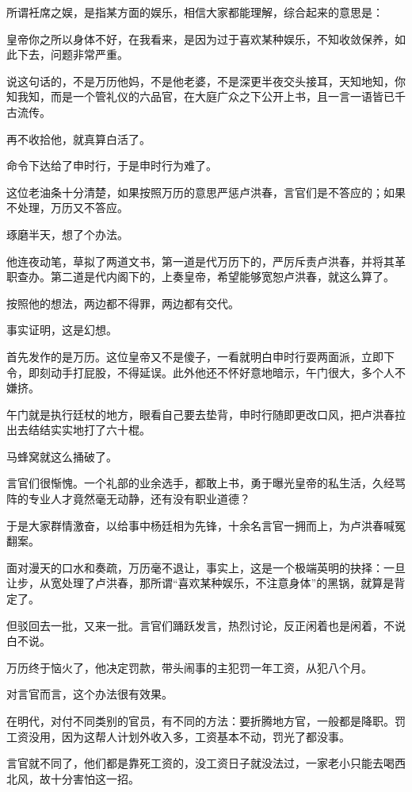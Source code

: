 \begin{multicols}{\theparacolNo}
		所谓衽席之娱，是指某方面的娱乐，相信大家都能理解，综合起来的意思是：

		皇帝你之所以身体不好，在我看来，是因为过于喜欢某种娱乐，不知收敛保养，如此下去，问题非常严重。

		说这句话的，不是万历他妈，不是他老婆，不是深更半夜交头接耳，天知地知，你知我知，而是一个管礼仪的六品官，在大庭广众之下公开上书，且一言一语皆已千古流传。

		再不收拾他，就真算白活了。

		命令下达给了申时行，于是申时行为难了。

		这位老油条十分清楚，如果按照万历的意思严惩卢洪春，言官们是不答应的；如果不处理，万历又不答应。

		琢磨半天，想了个办法。

		他连夜动笔，草拟了两道文书，第一道是代万历下的，严厉斥责卢洪春，并将其革职查办。第二道是代内阁下的，上奏皇帝，希望能够宽恕卢洪春，就这么算了。

		按照他的想法，两边都不得罪，两边都有交代。

		事实证明，这是幻想。

		首先发作的是万历。这位皇帝又不是傻子，一看就明白申时行耍两面派，立即下令，即刻动手打屁股，不得延误。此外他还不怀好意地暗示，午门很大，多个人不嫌挤。

		午门就是执行廷杖的地方，眼看自己要去垫背，申时行随即更改口风，把卢洪春拉出去结结实实地打了六十棍。

		马蜂窝就这么捅破了。

		言官们很惭愧。一个礼部的业余选手，都敢上书，勇于曝光皇帝的私生活，久经骂阵的专业人才竟然毫无动静，还有没有职业道德？

		于是大家群情激奋，以给事中杨廷相为先锋，十余名言官一拥而上，为卢洪春喊冤翻案。

		面对漫天的口水和奏疏，万历毫不退让，事实上，这是一个极端英明的抉择：一旦让步，从宽处理了卢洪春，那所谓“喜欢某种娱乐，不注意身体”的黑锅，就算是背定了。

		但驳回去一批，又来一批。言官们踊跃发言，热烈讨论，反正闲着也是闲着，不说白不说。

		万历终于恼火了，他决定罚款，带头闹事的主犯罚一年工资，从犯八个月。

		对言官而言，这个办法很有效果。

		在明代，对付不同类别的官员，有不同的方法：要折腾地方官，一般都是降职。罚工资没用，因为这帮人计划外收入多，工资基本不动，罚光了都没事。

		言官就不同了，他们都是靠死工资的，没工资日子就没法过，一家老小只能去喝西北风，故十分害怕这一招。


\end{multicols}
